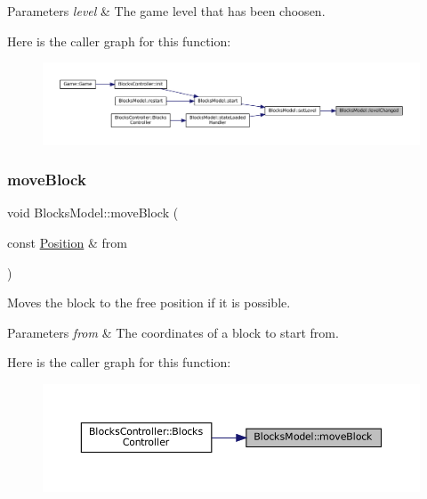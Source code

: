 \begin{DoxyParams}{Parameters}
{\em level} & The game level that has been choosen. \\
\hline
\end{DoxyParams}
Here is the caller graph for this function\+:
\nopagebreak
\begin{figure}[H]
\begin{center}
\leavevmode
\includegraphics[width=350pt]{class_blocks_model_aadc67f8541695e398bd80f66690308c4_icgraph}
\end{center}
\end{figure}
\mbox{\label{class_blocks_model_a8ce391f7ec760f11d166aead833aa002}} 
\subsubsection{\texorpdfstring{moveBlock}{moveBlock}}
{\footnotesize\ttfamily void Blocks\+Model\+::move\+Block (\begin{DoxyParamCaption}\item[{const \mbox{\hyperlink{struct_position}{Position}} \&}]{from }\end{DoxyParamCaption})\hspace{0.3cm}{\ttfamily [slot]}}



Moves the block to the free position if it is possible. 


\begin{DoxyParams}{Parameters}
{\em from} & The coordinates of a block to start from. \\
\hline
\end{DoxyParams}
Here is the caller graph for this function\+:
\nopagebreak
\begin{figure}[H]
\begin{center}
\leavevmode
\includegraphics[width=350pt]{class_blocks_model_a8ce391f7ec760f11d166aead833aa002_icgraph}
\end{center}
\end{figure}
\mbox{\label{class_blocks_model_a115cbe7c4e49a128ebcbae3b5c6c24ee}} 
